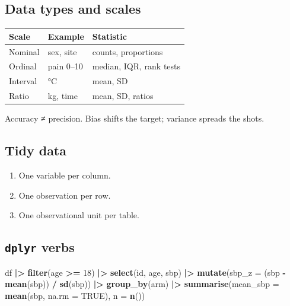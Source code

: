 \documentclass[
]{article}
\newenvironment{Shaded}{\begin{snugshade}}{\end{snugshade}}
\newcommand{\AttributeTok}[1]{\textcolor[rgb]{0.13,0.29,0.53}{#1}}
\newcommand{\ConstantTok}[1]{\textcolor[rgb]{0.56,0.35,0.01}{#1}}
\newcommand{\DecValTok}[1]{\textcolor[rgb]{0.00,0.00,0.81}{#1}}
\newcommand{\FunctionTok}[1]{\textcolor[rgb]{0.13,0.29,0.53}{\textbf{#1}}}
\newcommand{\NormalTok}[1]{#1}
\newcommand{\SpecialCharTok}[1]{\textcolor[rgb]{0.81,0.36,0.00}{\textbf{#1}}}
\newcounter{none} %
\providecommand{\tightlist}{%
  \setlength{\itemsep}{0pt}\setlength{\parskip}{0pt}}
\begin{document}
\subsection{Data types and scales}\label{data-types-and-scales}

{\def\LTcaptype{none} %
\begin{longtable}[]{@{}lll@{}}
\toprule\noalign{}
Scale & Example & Statistic \\
\midrule\noalign{}
\endhead
\bottomrule\noalign{}
\endlastfoot
Nominal & sex, site & counts, proportions \\
Ordinal & pain 0--10 & median, IQR, rank tests \\
Interval & °C & mean, SD \\
Ratio & kg, time & mean, SD, ratios \\
\end{longtable}
}

Accuracy ≠ precision. Bias shifts the target; variance spreads the
shots.

\subsection{Tidy data}\label{tidy-data}

\begin{enumerate}
\def\labelenumi{\arabic{enumi}.}
\tightlist
\item
  One variable per column.
\item
  One observation per row.
\item
  One observational unit per table.
\end{enumerate}

\subsection{\texorpdfstring{\texttt{dplyr}
verbs}{dplyr verbs}}\label{dplyr-verbs}

\begin{Shaded}
\begin{Highlighting}[]
\NormalTok{df }\SpecialCharTok{|\textgreater{}}
  \FunctionTok{filter}\NormalTok{(age }\SpecialCharTok{\textgreater{}=} \DecValTok{18}\NormalTok{) }\SpecialCharTok{|\textgreater{}}
  \FunctionTok{select}\NormalTok{(id, age, sbp) }\SpecialCharTok{|\textgreater{}}
  \FunctionTok{mutate}\NormalTok{(}\AttributeTok{sbp\_z =}\NormalTok{ (sbp }\SpecialCharTok{{-}} \FunctionTok{mean}\NormalTok{(sbp)) }\SpecialCharTok{/} \FunctionTok{sd}\NormalTok{(sbp)) }\SpecialCharTok{|\textgreater{}}
  \FunctionTok{group\_by}\NormalTok{(arm) }\SpecialCharTok{|\textgreater{}}
  \FunctionTok{summarise}\NormalTok{(}\AttributeTok{mean\_sbp =} \FunctionTok{mean}\NormalTok{(sbp, }\AttributeTok{na.rm =} \ConstantTok{TRUE}\NormalTok{), }\AttributeTok{n =} \FunctionTok{n}\NormalTok{())}
\end{Highlighting}
\end{Shaded}
\end{document}
